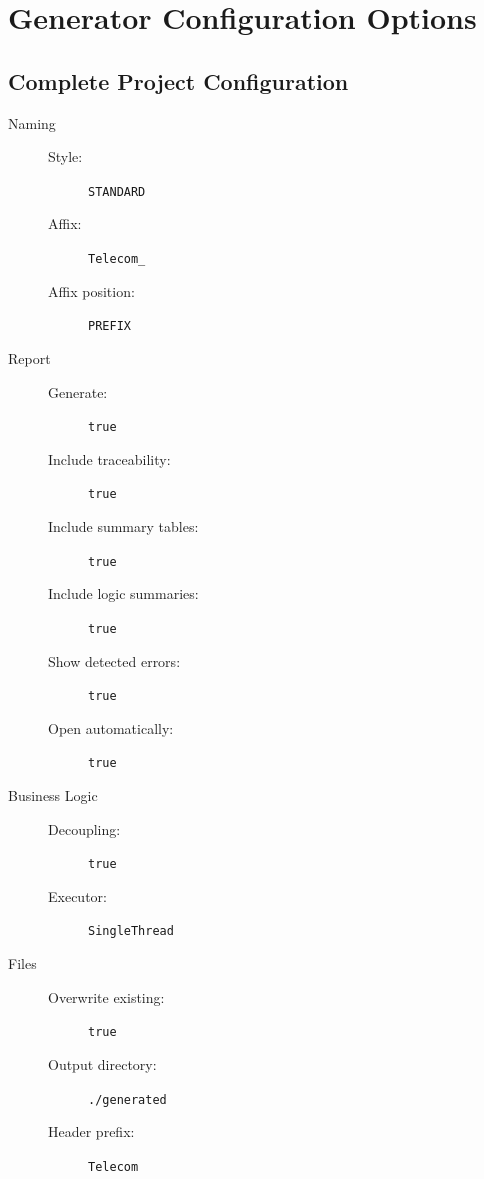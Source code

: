 \section{Generator Configuration Options}
\label{app:configs}


\subsection{Complete Project Configuration}
\label{app:config_first_batch}

\begin{description}
	\item[Naming]
	\begin{description}
		\item[Style:] \texttt{STANDARD}
		\item[Affix:] \texttt{Telecom\_}
		\item[Affix position:] \texttt{PREFIX}
	\end{description}
	
	\item[Report]
	\begin{description}
		\item[Generate:] \texttt{true}
		\item[Include traceability:] \texttt{true}
		\item[Include summary tables:] \texttt{true}
		\item[Include logic summaries:] \texttt{true}
		\item[Show detected errors:] \texttt{true}
		\item[Open automatically:] \texttt{true}
	\end{description}
	
	\item[Business Logic]
	\begin{description}
		\item[Decoupling:] \texttt{true}
		\item[Executor:] \texttt{SingleThread}
	\end{description}
	
	\item[Files]
	\begin{description}
		\item[Overwrite existing:] \texttt{true}
		\item[Output directory:] \texttt{./generated}
		\item[Header prefix:] \texttt{Telecom}
	\end{description}
	

\end{description}
